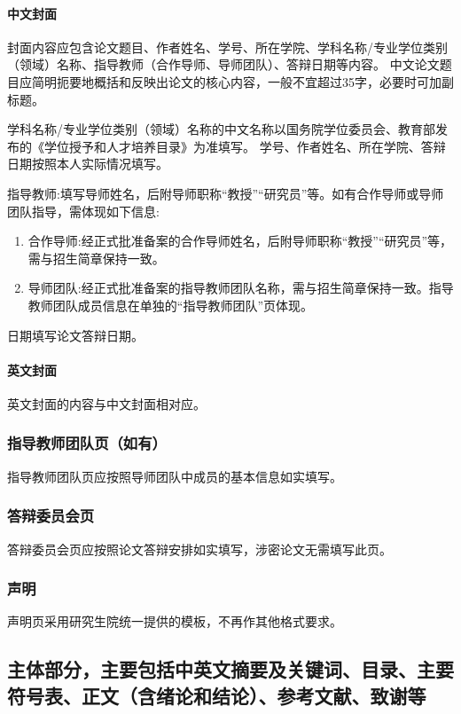 \paragraph{中文封面}
封面内容应包含论文题目、作者姓名、学号、所在学院、学科名称/专业学位类别（领域）名称、指导教师（合作导师、导师团队）、答辩日期等内容。
中文论文题目应简明扼要地概括和反映出论文的核心内容，一般不宜超过35字，必要时可加副标题。

学科名称/专业学位类别（领域）名称的中文名称以国务院学位委员会、教育部发布的《学位授予和人才培养目录》为准填写。
学号、作者姓名、所在学院、答辩日期按照本人实际情况填写。

指导教师:填写导师姓名，后附导师职称“教授”“研究员”等。如有合作导师或导师团队指导，需体现如下信息:
\begin{enumerate}[1)]
    \item 合作导师:经正式批准备案的合作导师姓名，后附导师职称“教授”“研究员”等，需与招生简章保持一致。
    \item 导师团队:经正式批准备案的指导教师团队名称，需与招生简章保持一致。指导教师团队成员信息在单独的“指导教师团队”页体现。
\end{enumerate}
日期填写论文答辩日期。

\paragraph{英文封面}
英文封面的内容与中文封面相对应。

\subsubsection{指导教师团队页（如有）}
指导教师团队页应按照导师团队中成员的基本信息如实填写。

\subsubsection{答辩委员会页}
答辩委员会页应按照论文答辩安排如实填写，涉密论文无需填写此页。

\subsubsection{声明}
\declaration

声明页采用研究生院统一提供的模板，不再作其他格式要求。


\subsection{主体部分，主要包括中英文摘要及关键词、目录、主要符号表、正文（含绪论和结论）、参考文献、致谢等}

